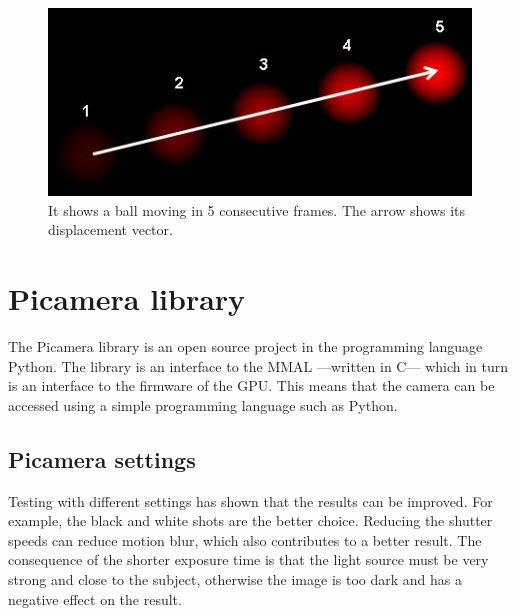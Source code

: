 \documentclass[12pt, a4paper]{report}
\begin{document}
    \noindent
    \begin{figure}[H]
    \centering
    \includegraphics[scale=0.7]{Images/optical_flow_basic1.jpg}
    
    \caption{It shows a ball moving in 5 consecutive frames. The arrow shows its displacement vector.}
    \end{figure}
    
    \newpage
    
    \section{Picamera library}
    The Picamera library is an open source project in the programming language Python. The library is an interface to the MMAL ---written in C--- which in turn is an interface to the firmware of the GPU.
    This means that the camera can be accessed using a simple programming language such as Python.
    
    \subsection {Picamera settings}
    Testing with different settings has shown that the results can be improved. For example, the black and white shots are the better choice. Reducing the shutter speeds can reduce motion blur, which also contributes to a better result.
    The consequence of the shorter exposure time is that the light source must be very strong and close to the subject, otherwise the image is too dark and has a negative effect on the result.
    
    
\end{document}
